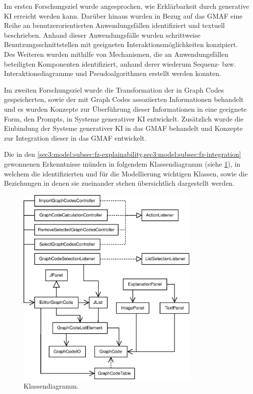 Im ersten Forschungsziel wurde angesprochen, wie Erklärbarkeit durch generative KI erreicht werden kann.
Darüber hinaus wurden in Bezug auf das GMAF eine Reihe an benutzerorientierten Anwendungsfällen identifiziert und textuell beschrieben.
Anhand dieser Anwendungsfälle wurden schrittweise Benutzungsschnittstellen mit geeigneten Interaktionsmöglichkeiten konzipiert.
Des Weiteren wurden mithilfe von Mechanismen, die an Anwendungsfällen beteiligten Komponenten identifiziert, anhand derer wiederum Sequenz- bzw. Interaktionsdiagramme und Pseudoalgorithmen erstellt werden konnten.

Im zweiten Forschungsziel wurde die Transformation der in Graph Codes gespeicherten, sowie der mit Graph Codes assoziierten Informationen behandelt und es wurden Konzepte zur Überführung dieser Informationen in eine geeignete Form, den Prompts, in Systeme generativer KI entwickelt.
Zusätzlich wurde die Einbindung der Systeme generativer KI in das GMAF behandelt und Konzepte zur Integration dieser in das GMAF entwickelt.

Die in den \cref{sec3:model:subsec:fz-explainability,sec3:model:subsec:fz-integration} gewonnenen Erkenntnisse münden in folgendem Klassendiagramm (siehe \cref{sec3:model:subsec:summary:fig:class-diagram}), in welchem die identifizierten und für die Modellierung wichtigen Klassen, sowie die Beziehungen in denen sie zueinander stehen übersichtlich dargestellt werden.

\begin{figure}[htb]
  \centering
  \includegraphics[width=0.8\textwidth]{chapter/chapter_3/class.eps}
  \caption{Klassendiagramm.}
  \label{sec3:model:subsec:summary:fig:class-diagram}
\end{figure}

